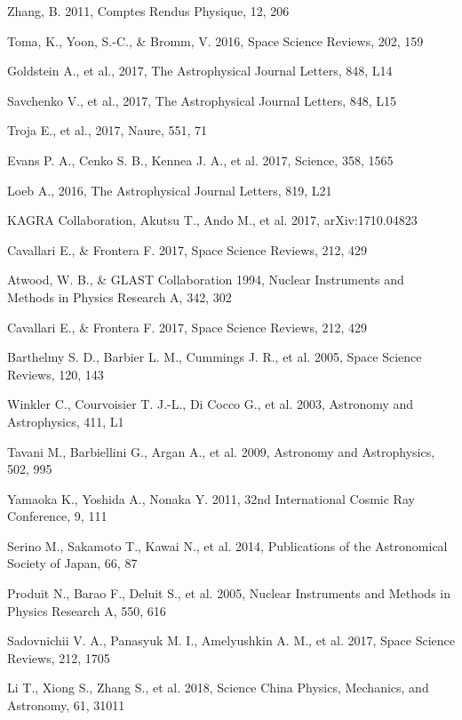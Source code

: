 \documentclass[12pt, a4paper,titlepage]{article}
\numberwithin{equation}{section}
\numberwithin{figure}{section}
\begin{document}
\begin{thebibliography}{99}
 Zhang, B. 2011, Comptes Rendus Physique, 12, 206

 Toma, K., Yoon, S.-C., \& Bromm, V. 2016, Space Science Reviews, 202, 159

 Goldstein A., et al., 2017, The Astrophysical Journal Letters, 848, L14

 Savchenko V., et al., 2017, The Astrophysical Journal Letters, 848, L15

 Troja E., et al., 2017, Naure, 551, 71

 Evans P. A., Cenko S. B., Kennea J. A., et al. 2017, Science, 358, 1565

 Loeb A., 2016, The Astrophysical Journal Letters, 819, L21

 KAGRA Collaboration, Akutsu T., Ando M., et al. 2017, arXiv:1710.04823

 Cavallari E., \& Frontera F. 2017, Space Science Reviews, 212, 429
 
 Atwood, W. B., \& GLAST Collaboration 1994, Nuclear Instruments and Methods in Physics Research
A, 342, 302

 Cavallari E., \& Frontera F. 2017, Space Science Reviews, 212, 429

 Barthelmy S. D., Barbier L. M., Cummings J. R., et al. 2005, Space Science Reviews, 120, 143

 Winkler C., Courvoisier T. J.-L., Di Cocco G., et al. 2003, Astronomy and Astrophysics, 411, L1

 Tavani M., Barbiellini G., Argan A., et al. 2009, Astronomy and Astrophysics, 502, 995

 Yamaoka K., Yoshida A., Nonaka Y. 2011, 32nd International Cosmic Ray Conference, 9, 111

 Serino M., Sakamoto T., Kawai N., et al. 2014, Publications of the Astronomical Society of Japan, 66,
87

 Produit N., Barao F., Deluit S., et al. 2005, Nuclear Instruments and Methods in Physics Research A,
550, 616

 Sadovnichii V. A., Panasyuk M. I., Amelyushkin A. M., et al. 2017, Space Science Reviews, 212, 1705

 Li T., Xiong S., Zhang S., et al. 2018, Science China Physics, Mechanics, and Astronomy, 61, 31011


\end{thebibliography}
\end{document}
